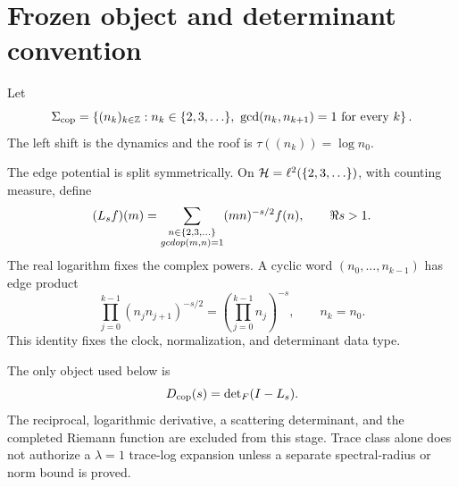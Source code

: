 \section{Frozen object and determinant convention}

\begin{definition}
Let
\[
\Sigma_{\cop}=\left\{(n_k)_{k\in\mathbb Z}: n_k\in\I,\ 
\gcdop(n_k,n_{k+1})=1\text{ for every }k\right\}.
\]
The left shift is the dynamics and the roof is
\(\tau((n_k))=\log n_0\).
\end{definition}

The edge potential is split symmetrically.  On
\(\mathcal H=\ell^2(\{2,3,\ldots\})\), with counting measure, define
\[
(L_s f)(m)=\sum_{\substack{n\in\{2,3,\ldots\}\\gcdop(m,n)=1}}
(mn)^{-s/2}f(n),\qquad \Re s>1.
\]
The real logarithm fixes the complex powers.  A cyclic word
\((n_0,\ldots,n_{k-1})\) has edge product
\[
\prod_{j=0}^{k-1}(n_jn_{j+1})^{-s/2}
=\left(\prod_{j=0}^{k-1}n_j\right)^{-s},
\qquad n_k=n_0.
\]
This identity fixes the clock, normalization, and determinant data type.

\begin{remark}
The only object used below is
\[
D_{\mathrm{cop}}(s)=\operatorname{det}_{F}(I-L_s).
\]
The reciprocal, logarithmic derivative, a scattering determinant, and the
completed Riemann function are excluded from this stage.  Trace class alone
does not authorize a \(\lambda=1\) trace-log expansion unless a separate
spectral-radius or norm bound is proved.
\end{remark}
